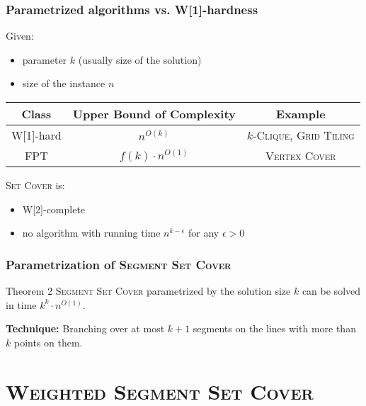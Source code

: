 \documentclass{beamer}
\begin{document}
\begin{frame}
\frametitle{Parametrized algorithms vs. W[1]-hardness}
Given:
\begin{itemize}
\item parameter $k$ (usually size of the solution)
\item size of the instance $n$
\end{itemize}
\bigskip

\begin{tabular}{|c|c|c|}
\hline
\textbf{Class} & \textbf{Upper Bound of Complexity} & \textbf{Example}\\
\hline
W[1]-hard & $n^{O(k)}$ & \textsc{$k$-Clique}, \textsc{Grid Tiling}\\
\hline
FPT & $f(k) \cdot n^{O(1)}$ & \textsc{Vertex Cover}\\
\hline
\end{tabular}

\bigskip
\textsc{Set Cover} is:
\begin{itemize}
\item W[2]-complete
\item no algorithm with running time $n^{k-\epsilon}$ for any $\epsilon > 0$
\end{itemize}
\end{frame}

\begin{frame}
\frametitle{Parametrization of \textsc{Segment Set Cover}}
\begin{block}{Theorem 2}
	\textsc{Segment Set Cover} parametrized by the solution size $k$
	can be solved in time $k^k \cdot n^{O(1)}$.
\end{block}

\textbf{Technique:} Branching over at most $k+1$
segments on the lines with more than $k$ points on them.
\end{frame}

\section{\textsc{Weighted Segment Set Cover}} 
\end{document}
